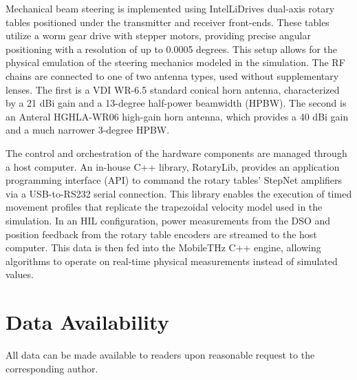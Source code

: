 \documentclass[fleqn,10pt]{wlscirep}
\begin{document}
Mechanical beam steering is implemented using IntelLiDrives dual-axis rotary tables positioned under the transmitter and receiver front-ends. These tables utilize a worm gear drive with stepper motors, providing precise angular positioning with a resolution of up to 0.0005 degrees. This setup allows for the physical emulation of the steering mechanics modeled in the simulation. The RF chains are connected to one of two antenna types, used without supplementary lenses. The first is a VDI WR-6.5 standard conical horn antenna, characterized by a 21 dBi gain and a 13-degree half-power beamwidth (HPBW). The second is an Anteral HGHLA-WR06 high-gain horn antenna, which provides a 40 dBi gain and a much narrower 3-degree HPBW.

The control and orchestration of the hardware components are managed through a host computer. An in-house C++ library, RotaryLib, provides an application programming interface (API) to command the rotary tables' StepNet amplifiers via a USB-to-RS232 serial connection. This library enables the execution of timed movement profiles that replicate the trapezoidal velocity model used in the simulation. In an HIL configuration, power measurements from the DSO and position feedback from the rotary table encoders are streamed to the host computer. This data is then fed into the MobileTHz C++ engine, allowing algorithms to operate on real-time physical measurements instead of simulated values.




\section*{Data Availability}
All data can be made available to readers upon reasonable request to the corresponding author. 



\end{document}
